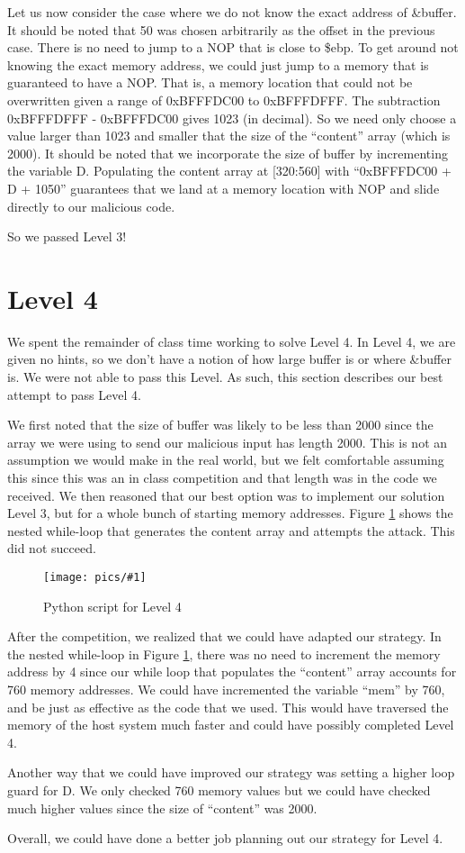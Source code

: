 \documentclass[11pt]{article}
\newcommand{\fig}[2]{ 
\begin{figure}[h]
	\centering
	\caption{#2}
	\texttt{[image: pics/\#1]}
	\label{fig:#1}
\end{figure} 
}
\begin{document}
Let us now consider the case where we do not know the exact address of \&buffer. It should be noted that 50 was chosen arbitrarily as the offset in the previous case. There is no need to jump to a NOP that is close to \$ebp. To get around not knowing the exact memory address, we could just jump to a memory that is guaranteed to have a NOP. That is, a memory location that could not be overwritten given a range of 0xBFFFDC00 to 0xBFFFDFFF. The subtraction 0xBFFFDFFF - 0xBFFFDC00 gives 1023 (in decimal). So we need only choose a value larger than 1023 and smaller that the size of the ``content'' array (which is 2000). It should be noted that we incorporate the size of buffer by incrementing the variable D. Populating the content array at [320:560] with ``0xBFFFDC00 + D + 1050'' guarantees that we land at a memory location with NOP and slide directly to our malicious code.

So we passed Level 3!

\newpage

\section*{Level 4}

We spent the remainder of class time working to solve Level 4. In Level 4, we are given no hints, so we don't have a notion of how large buffer is or where \&buffer is. We were not able to pass this Level. As such, this section describes our best attempt to pass Level 4.

We first noted that the size of buffer was likely to be less than 2000 since the array we were using to send our malicious input has length 2000. This is not an assumption we would make in the real world, but we felt comfortable assuming this since this was an in class competition and that length was in the code we received. We then reasoned that our best option was to implement our solution Level 3, but for a whole bunch of starting memory addresses. Figure \ref{fig:level4} shows the nested while-loop that generates the content array and attempts the attack. This did not succeed.

\fig{level4}{Python script for Level 4}

After the competition, we realized that we could have adapted our strategy. In the nested while-loop in Figure \ref{fig:level4}, there was no need to increment the memory address by 4 since our while loop that populates the ``content'' array accounts for 760 memory addresses. We could have incremented the variable ``mem'' by 760, and be just as effective as the code that we used. This would have traversed the memory of the host system much faster and could have possibly completed Level 4.

Another way that we could have improved our strategy was setting a higher loop guard for D. We only checked 760 memory values but we could have checked much higher values since the size of ``content'' was 2000.

Overall, we could have done a better job planning out our strategy for Level 4.
\end{document}

